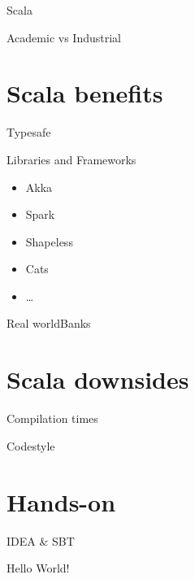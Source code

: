 \documentclass[aspectratio=169]{beamer}
\begin{document}
\begin{frame}[t]{Scala}
  
\end{frame}

\begin{frame}[t]{Academic vs Industrial}
  
\end{frame}

\section{Scala benefits}

\begin{frame}[t]{Typesafe}
  
\end{frame}

\begin{frame}[t]{Libraries and Frameworks}
  \begin{itemize}
    \item Akka
    \item Spark
    \item Shapeless
    \item Cats
    \item \ldots
  \end{itemize}
\end{frame}

\begin{frame}[t]{Real world}{Banks}
  
\end{frame}

\section{Scala downsides}

\begin{frame}[t]{Compilation times}
  
\end{frame}

\begin{frame}[t]{Codestyle}
  
\end{frame}

\section{Hands-on}

\begin{frame}[t]{IDEA \& SBT}
  
\end{frame}

\begin{frame}[t]{Hello World!}
  
\end{frame}
\end{document}
